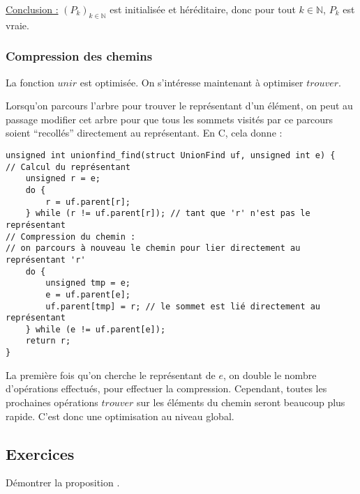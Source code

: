 \documentclass[../../../main.tex]{subfiles}
\begin{document}
\underline{Conclusion :} $(P_k)_{k\in\mathbb{N}}$ est initialisée et héréditaire, donc pour tout $k\in\mathbb{N}$, $P_k$ est vraie.
\subsubsection{Compression des chemins}
La fonction $unir$ est optimisée. On s'intéresse maintenant à optimiser $trouver$. 

Lorsqu'on parcours l'arbre pour trouver le représentant d'un élément, on peut au passage modifier cet arbre pour que tous les sommets visités par ce parcours soient ``recollés'' directement au représentant. En C, cela donne :
\begin{verbatim}
unsigned int unionfind_find(struct UnionFind uf, unsigned int e) {
// Calcul du représentant
	unsigned r = e;
	do {
		r = uf.parent[r];
	} while (r != uf.parent[r]); // tant que 'r' n'est pas le représentant
// Compression du chemin :
// on parcours à nouveau le chemin pour lier directement au représentant 'r'
	do {
		unsigned tmp = e;
		e = uf.parent[e];
		uf.parent[tmp] = r; // le sommet est lié directement au représentant
	} while (e != uf.parent[e]);
	return r;
}
\end{verbatim}
La première fois qu'on cherche le représentant de $e$, on double le nombre d'opérations effectués, pour effectuer la compression. Cependant, toutes les prochaines opérations $trouver$ sur les éléments du chemin seront beaucoup plus rapide. C'est donc une optimisation au niveau global.
\subsection{Exercices}
 Démontrer la proposition .
\end{document}
